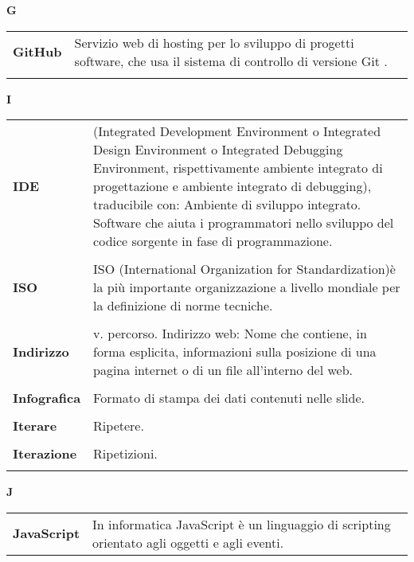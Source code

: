 {\begin{longtable}{L{4cm} p{10cm}}
 \\ 
\end{longtable} 
\newpage 
{} 
{} 
\hfill\Huge{\textbf{G}} \\ 
\normalsize 
\begin{longtable}{L{4cm} p{10cm}}
\textbf{GitHub} & Servizio web di hosting per lo sviluppo di progetti software, che usa il sistema di controllo di versione Git . \\ 
 \\ 
\end{longtable} 
\newpage 
{} 
{} 
\hfill\Huge{\textbf{I}} \\ 
\normalsize 
\begin{longtable}{L{4cm} p{10cm}}
\textbf{IDE} & (Integrated Development Environment o Integrated Design Environment o Integrated Debugging Environment, rispettivamente ambiente integrato di progettazione e ambiente integrato di debugging), traducibile con: Ambiente di sviluppo integrato. Software che aiuta i programmatori nello sviluppo del codice sorgente in fase di programmazione. \\ 
 \\ 
\textbf{ISO} & ISO (International Organization for Standardization)è la più importante organizzazione a livello mondiale per la definizione di norme tecniche. \\ 
 \\ 
\textbf{Indirizzo} & v. percorso. Indirizzo web: Nome che contiene, in forma esplicita, informazioni sulla posizione di una pagina internet o di un file all'interno del web. \\ 
 \\ 
\textbf{Infografica} & Formato di stampa dei dati contenuti nelle slide. \\ 
 \\ 
\textbf{Iterare} & Ripetere. \\ 
 \\ 
\textbf{Iterazione} & Ripetizioni. \\ 
 \\ 
\end{longtable} 
\newpage 
{} 
{} 
\hfill\Huge{\textbf{J}} \\ 
\normalsize 
\begin{longtable}{L{4cm} p{10cm}}
\textbf{JavaScript} & In informatica JavaScript è un linguaggio di scripting orientato agli oggetti e agli eventi. \\ 

\end{longtable}}
